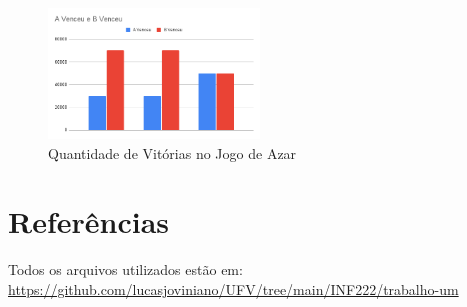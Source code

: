 \documentclass{report}
\begin{document}
\begin{table}[h]
    \caption{Informações Sobre partidas do Jogo de Azar}
    \label{table:azar}
    \centering
\end{table}
\begin{figure}[h]
    \caption{Quantidade de Vitórias no Jogo de Azar}
    \label{fig:azar}
    \centering
    \includegraphics[width=0.5\textwidth]{winners.png}
    \end{figure}
\newpage

\section{Referências}

Todos os arquivos utilizados estão em: \url{https://github.com/lucasjoviniano/UFV/tree/main/INF222/trabalho-um}
\end{document}
